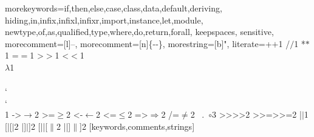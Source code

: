 \usepackage{listings}
\usepackage{lstlinebgrd}
\usepackage{etoolbox}
\usepackage{letltxmacro}

\ifprint
  \newcommand\KeywordStyle \textbf

\else
  \newcommand\KeywordStyle \tt
\fi


%
  {morekeywords={if,then,else,case,class,data,default,deriving,%
      hiding,in,infix,infixl,infixr,import,instance,let,module,%
      newtype,of,as,qualified,type,where,do,return,forall},%
   keepspaces,%
   sensitive,%
   morecomment=[l]--,%
   morecomment=[n]{\{-}{-\}},%
   morestring=[b]",%
   literate={+}{{$+$}}1 {/}{{$/$}}1 {*}{{$*$}}1 {=}{{$=$}}1
            {>}{{$>$}}1 {<}{{$<$}}1 {\\}{{$\lambda$}}1
            {\\\\}{{\char`\\\char`\\}}1
            {->}{{$\rightarrow$}}2 {>=}{{$\geq$}}2 {<-}{{$\leftarrow$}}2
            {<=}{{$\leq$}}2 {=>}{{$\Rightarrow$}}2 
            {/=}{{$\ne$}}2
            {\ .\ }{{$\circ$}}3
            {>>}{{>>}}2 {>>=}{{>>=}}2
            {|}{{$\mid$}}1
            {[|}{{[$|$}}2
            {|]}{{$|$]}}2
            {[||}{{[$\|$}}2
            {||]}{{$\|$]}}2
  }[keywords,comments,strings]%
\lstset{language=Haskell}

